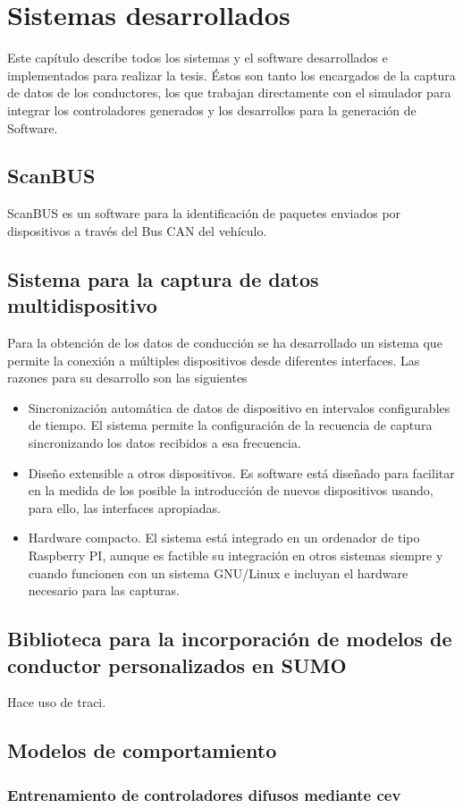 \chapter{Sistemas desarrollados}
\label{ch:developed-software}

Este capítulo describe todos los sistemas y el software desarrollados e implementados para realizar la tesis. Éstos son tanto los encargados de la captura de datos de los conductores, los que trabajan directamente con el simulador para integrar los controladores generados y los desarrollos para la generación de Software.

\section{ScanBUS}

ScanBUS es un software para la identificación de paquetes enviados por dispositivos a través del Bus CAN del vehículo.

\section{Sistema para la captura de datos multidispositivo}

Para la obtención de los datos de conducción se ha desarrollado un sistema que permite la conexión a múltiples dispositivos desde diferentes interfaces. Las razones para su desarrollo son las siguientes

\begin{itemize}
	\item Sincronización automática de datos de dispositivo en intervalos configurables de tiempo. El sistema permite la configuración de la recuencia de captura sincronizando los datos recibidos a esa frecuencia.
	\item Diseño extensible a otros dispositivos. Es software está diseñado para facilitar en la medida de los posible la introducción de nuevos dispositivos usando, para ello, las interfaces apropiadas.
	\item Hardware compacto. El sistema está integrado en un ordenador de tipo Raspberry PI, aunque es factible su integración en otros sistemas siempre y cuando funcionen con un sistema GNU/Linux e incluyan el hardware necesario para las capturas.
\end{itemize}

\section{Biblioteca para la incorporación de modelos de conductor personalizados en SUMO}

Hace uso de \gls{traci}.

\section{Modelos de comportamiento}

\subsection{Entrenamiento de controladores difusos mediante \gls{cev}}

